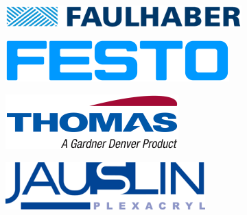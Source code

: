\begin{figure}[h!]
    \begin{subfigure}[h]{0.15\textheight}
        \includegraphics[width=\textwidth]{images/sponsors/faulhaber}
    \end{subfigure}%
    \hspace{1cm}
    \begin{subfigure}[h]{0.15\textheight}
        \includegraphics[width=\textwidth]{images/sponsors/festo}
    \end{subfigure}
\vspace{0.4cm}


    \begin{subfigure}[h]{0.15\textheight}
        \includegraphics[width=\textwidth]{images/sponsors/gardnerDenverThomas}
    \end{subfigure}%
    \hspace{1cm}
    \begin{subfigure}[h] {0.15\textheight}
        \includegraphics[width=\textwidth]{images/sponsors/jauslin}
    \end{subfigure}
\vspace{0.4cm}



\end{figure}
